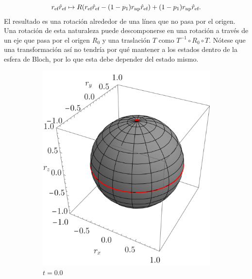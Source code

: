 \begin{equation}
    r_{\text{ef}}\hat{r}_{\text{ef}}\mapsto R(r_{\text{ef}}\hat{r}_{\text{ef}}-(1-p_{1})r_{\text{np}}\hat{r}_{\text{ef}})+(1-p_{1})r_{\text{np}}\hat{r}_{\text{ef}}.\nonumber
\end{equation}
El resultado es una rotación alrededor de una línea que no pasa por el origen. Una rotación de esta naturaleza puede descomponerse en una rotación a través de un eje que pasa por el origen $R_{0}$ y una traslación $T$ como $T^{-1}\circ R_{0}\circ T$. Nótese que una transformación así no tendría por qué mantener a los estados dentro de la esfera de Bloch, por lo que esta debe depender del estado mismo. 

\begin{figure}[ht!]
    \centering
    \begin{subfigure}{0.32\textwidth}
      \centering
      \includegraphics[width=0.9\linewidth]{chapter3/figures_separable/szxId_t=0._p=0.6_r=0.9.png}
      \caption{$t=0.0$}
    \end{subfigure}%
    \begin{subfigure}{0.32\textwidth}
      \centering

\end{subfigure}
\end{figure}
